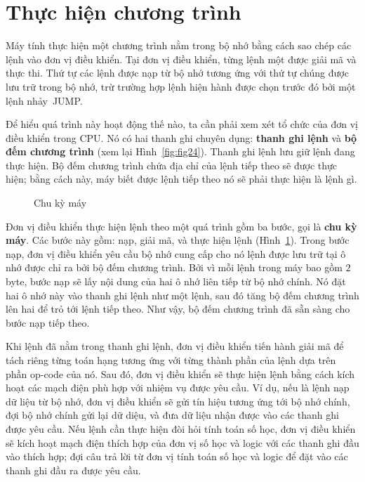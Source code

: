 \section{Thực hiện chương trình}
\label{sec:2.3}


Máy tính thực hiện một chương trình nằm trong bộ nhớ bằng cách sao chép các lệnh vào đơn
vị điều khiển. Tại đơn vị điều khiển, từng lệnh một được giải mã và thực thi. Thứ tự các
lệnh được nạp từ bộ nhớ tương ứng với thứ tự chúng được lưu trữ trong bộ nhớ, trừ trường
hợp lệnh hiện hành được chọn trước đó bởi một lệnh nhảy~JUMP.

Để hiểu quá trình này hoạt động thế nào, ta cần phải xem xét tổ chức của đơn vị điều khiển
trong CPU. Nó có hai thanh ghi chuyên dụng: \textbf{thanh ghi lệnh} và \textbf{bộ đếm
  chương trình} (xem lại Hình~\ref{fig:fig24}). Thanh ghi lệnh lưu giữ lệnh đang thực
hiện. Bộ đếm chương trình chứa địa chỉ của lệnh tiếp theo sẽ được thực hiện; bằng cách
này, máy biết được lệnh tiếp theo nó sẽ phải thực hiện là lệnh gì.

\begin{figure}[tbh]
  \begin{center}
    
  \end{center}
  \caption{Chu kỳ máy}
  \label{fig:fig28}
\end{figure}
Đơn vị điều khiển thực hiện lệnh theo một quá trình gồm ba bước, gọi là \textbf{chu kỳ
  máy}.  Các bước này gồm: nạp, giải mã, và thực hiện lệnh (Hình~\ref{fig:fig28}). Trong
bước nạp, đơn vị điều khiển yêu cầu bộ nhớ cung cấp cho nó lệnh được lưu trữ tại ô nhớ
được chỉ ra bởi bộ đếm chương trình. Bởi vì mỗi lệnh trong máy bao gồm $2$ byte, bước nạp
sẽ lấy nội dung của hai ô nhớ liên tiếp từ bộ nhớ chính. Nó đặt hai ô nhớ này vào thanh
ghi lệnh như một lệnh, sau đó tăng bộ đếm chương trình lên hai để trỏ tới lệnh tiếp
theo. Như vậy, bộ đếm chương trình đã sẵn sàng cho bước nạp tiếp theo.

Khi lệnh đã nằm trong thanh ghi lệnh, đơn vị điều khiển tiến hành giải mã để tách riêng
từng toán hạng tương ứng với từng thành phần của lệnh dựa trên phần op-code của nó. Sau
đó, đơn vị điều khiển sẽ thực hiện lệnh bằng cách kích hoạt các mạch điện phù hợp với
nhiệm vụ được yêu cầu. Ví dụ, nếu là lệnh nạp dữ liệu từ bộ nhớ, đơn vị điều khiển sẽ gửi
tín hiệu tương ứng tới bộ nhớ chính, đợi bộ nhớ chính gửi lại dữ diệu, và đưa dữ liệu nhận
được vào các thanh ghi được yêu cầu. Nếu lệnh cần thực hiện đòi hỏi tính toán số học, đơn
vị điều khiển sẽ kích hoạt mạch điện thích hợp của đơn vị số học và logic với các thanh
ghi đầu vào thích hợp; đợi câu trả lời từ đơn vị tính toán số học và logic để đặt vào các
thanh ghi đầu ra được yêu cầu.

